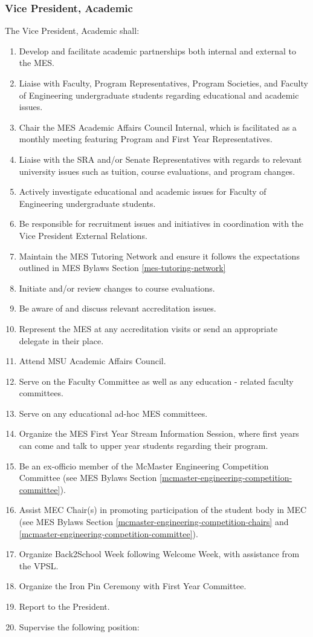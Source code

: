 \subsubsection{Vice President,
 Academic}
\label{vice-president-academic}
The Vice President, Academic shall:

\begin{enumerate}
 \item
  Develop and facilitate academic partnerships both internal and external to the MES.
 \item
  Liaise with Faculty, Program Representatives, Program Societies, and Faculty of Engineering undergraduate students regarding educational and academic issues.
 \item
  Chair the MES Academic Affairs Council Internal, which is facilitated as a monthly meeting featuring Program and First Year Representatives.
 \item
  Liaise with the SRA and/or Senate Representatives with regards to relevant university issues such as tuition, course evaluations, and program changes.
 \item
  Actively investigate educational and academic issues for Faculty of Engineering undergraduate students.
 \item
  Be responsible for recruitment issues and initiatives in coordination with the Vice President External Relations.
 \item
  Maintain the MES Tutoring Network and ensure it follows the expectations outlined in MES Bylaws Section \ref{mes-tutoring-network}
 \item
  Initiate and/or review changes to course evaluations.
 \item
  Be aware of and discuss relevant accreditation issues.
 \item
  Represent the MES at any accreditation visits or send an appropriate delegate in their place.
 \item
  Attend MSU Academic Affairs Council.
 \item
  Serve on the Faculty Committee as well as any education - related faculty committees.
 \item
  Serve on any educational ad-hoc MES committees.
 \item
  Organize the MES First Year Stream Information Session, where first years can come and talk to upper year students regarding their program.
 \item
  Be an ex-officio member of the McMaster Engineering Competition Committee (see MES Bylaws Section \ref{mcmaster-engineering-competition-committee}).
 \item
  Assist MEC Chair(s) in promoting participation of the student body in MEC (see MES Bylaws Section \ref{mcmaster-engineering-competition-chairs} and \ref{mcmaster-engineering-competition-committee}).
 \item
  Organize Back2School Week following Welcome Week, with assistance from the VPSL.
 \item
  Organize the Iron Pin Ceremony with First Year Committee.
 \item
  Report to the President.
 \item
  Supervise the following position:


\end{enumerate}
